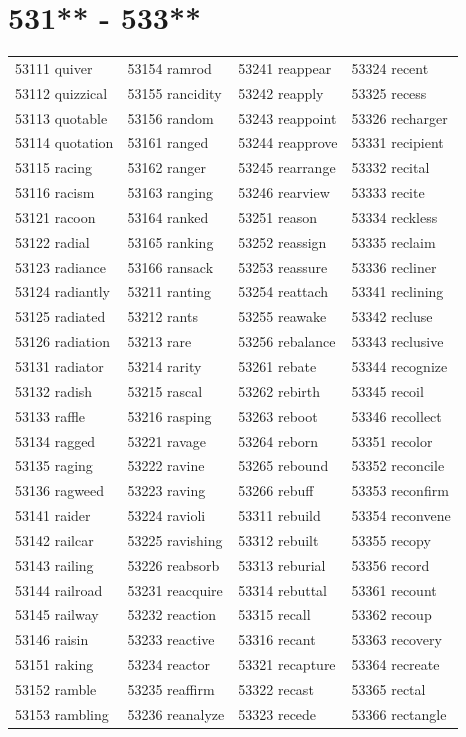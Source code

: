\documentclass[10pt, oneside]{book}
\begin{document}
\begin{table}
	\centering
	\section*{531** - 533**}
	\begin{tabular}{l l l l}
53111 quiver &53154 ramrod &53241 reappear &53324 recent\\
53112 quizzical &53155 rancidity &53242 reapply &53325 recess\\
53113 quotable &53156 random &53243 reappoint &53326 recharger\\
53114 quotation &53161 ranged &53244 reapprove &53331 recipient\\
53115 racing &53162 ranger &53245 rearrange &53332 recital\\
53116 racism &53163 ranging &53246 rearview &53333 recite\\
53121 racoon &53164 ranked &53251 reason &53334 reckless\\
53122 radial &53165 ranking &53252 reassign &53335 reclaim\\
53123 radiance &53166 ransack &53253 reassure &53336 recliner\\
53124 radiantly &53211 ranting &53254 reattach &53341 reclining\\
53125 radiated &53212 rants &53255 reawake &53342 recluse\\
53126 radiation &53213 rare &53256 rebalance &53343 reclusive\\
53131 radiator &53214 rarity &53261 rebate &53344 recognize\\
53132 radish &53215 rascal &53262 rebirth &53345 recoil\\
53133 raffle &53216 rasping &53263 reboot &53346 recollect\\
53134 ragged &53221 ravage &53264 reborn &53351 recolor\\
53135 raging &53222 ravine &53265 rebound &53352 reconcile\\
53136 ragweed &53223 raving &53266 rebuff &53353 reconfirm\\
53141 raider &53224 ravioli &53311 rebuild &53354 reconvene\\
53142 railcar &53225 ravishing &53312 rebuilt &53355 recopy\\
53143 railing &53226 reabsorb &53313 reburial &53356 record\\
53144 railroad &53231 reacquire &53314 rebuttal &53361 recount\\
53145 railway &53232 reaction &53315 recall &53362 recoup\\
53146 raisin &53233 reactive &53316 recant &53363 recovery\\
53151 raking &53234 reactor &53321 recapture &53364 recreate\\
53152 ramble &53235 reaffirm &53322 recast &53365 rectal\\
53153 rambling &53236 reanalyze &53323 recede &53366 rectangle\\
	\end{tabular}
 \end{table}
\clearpage
\end{document}
